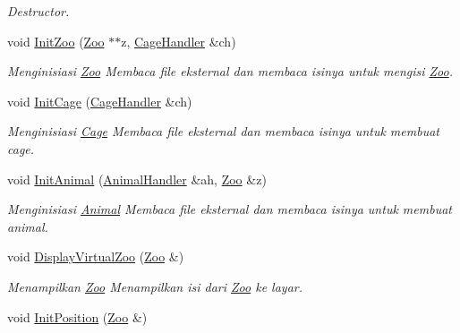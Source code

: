 \begin{DoxyCompactItemize}
\begin{DoxyCompactList}\small\item\em Destructor. \end{DoxyCompactList}\item 
void \hyperlink{classDriver_a7beba85f4b72a9ce62b6be04585d7c06}{Init\+Zoo} (\hyperlink{classZoo}{Zoo} $\ast$$\ast$z, \hyperlink{classCageHandler}{Cage\+Handler} \&ch)
\begin{DoxyCompactList}\small\item\em Menginisiasi \hyperlink{classZoo}{Zoo} Membaca file eksternal dan membaca isinya untuk mengisi \hyperlink{classZoo}{Zoo}. \end{DoxyCompactList}\item 
void \hyperlink{classDriver_ac709deb2cb009df905c1be2fe33c9ba6}{Init\+Cage} (\hyperlink{classCageHandler}{Cage\+Handler} \&ch)
\begin{DoxyCompactList}\small\item\em Menginisiasi \hyperlink{classCage}{Cage} Membaca file eksternal dan membaca isinya untuk membuat cage. \end{DoxyCompactList}\item 
void \hyperlink{classDriver_a3d2d11d8f8e99ef2bfe8b55227a2b9cf}{Init\+Animal} (\hyperlink{classAnimalHandler}{Animal\+Handler} \&ah, \hyperlink{classZoo}{Zoo} \&z)
\begin{DoxyCompactList}\small\item\em Menginisiasi \hyperlink{classAnimal}{Animal} Membaca file eksternal dan membaca isinya untuk membuat animal. \end{DoxyCompactList}\item 
void \hyperlink{classDriver_a966c5449a7c49685a7c69a58697a8537}{Display\+Virtual\+Zoo} (\hyperlink{classZoo}{Zoo} \&)\hypertarget{classDriver_a966c5449a7c49685a7c69a58697a8537}{}\label{classDriver_a966c5449a7c49685a7c69a58697a8537}

\begin{DoxyCompactList}\small\item\em Menampilkan \hyperlink{classZoo}{Zoo} Menampilkan isi dari \hyperlink{classZoo}{Zoo} ke layar. \end{DoxyCompactList}\item 
void \hyperlink{classDriver_a31e7c4799004a705523115be083686ca}{Init\+Position} (\hyperlink{classZoo}{Zoo} \&)\hypertarget{classDriver_a31e7c4799004a705523115be083686ca}{}\label{classDriver_a31e7c4799004a705523115be083686ca}


\end{DoxyCompactItemize}
